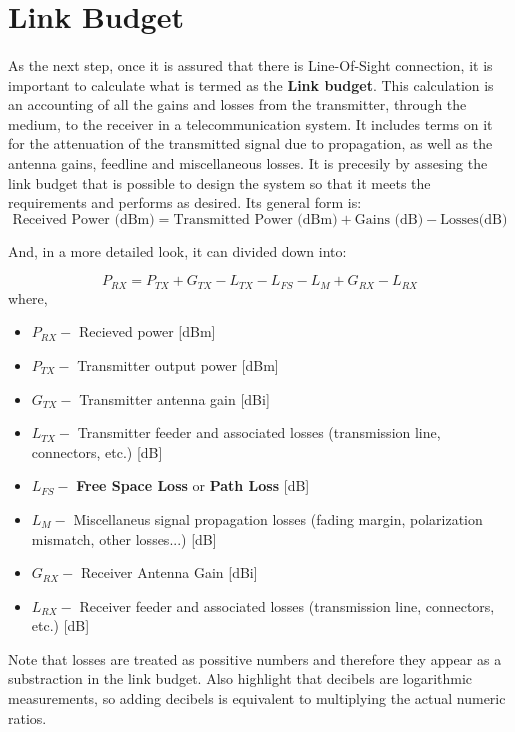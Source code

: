 \section{Link Budget}\label{subsec:link_budget}
\paragraph{}
As the next step, once it is assured that there is Line-Of-Sight connection, it is important to calculate what is termed as the \textbf{Link budget}. This calculation is an accounting of all the gains and losses from the transmitter, through the medium,  to the receiver in a telecommunication system. It includes terms on it for the attenuation of the transmitted signal due to propagation, as well as the antenna gains, feedline and miscellaneous losses. It is precesily by assesing the link budget that is possible to design the system so that it meets the requirements and performs as desired. Its general form is:
\begin{equation*}\label{eq:link_budget} 
 		\text{Received Power (dBm)} = \text{Transmitted Power (dBm)} + \text{Gains (dB)} - \text{Losses(dB)}
\end{equation*}

And, in a more detailed look, it can divided down into:

\begin{equation*}\label{eq:link_budget} 
 		P_{RX} = P_{TX} + G_{TX} - L_{TX} - L_{FS} - L_{M} + G_{RX} - L_{RX}
\end{equation*}
where,
\begin{itemize}
\item{$P_{RX} -$ Recieved power [dBm]}
\item{$P_{TX} -$ Transmitter output power [dBm]}
\item{$G_{TX} -$ Transmitter antenna gain [dBi]}
\item{$L_{TX} -$ Transmitter feeder and associated losses (transmission line, connectors, etc.) [dB]}
\item{$L_{FS} -$ \textbf{Free Space Loss} or \textbf{Path Loss} [dB]}
\item{$L_{M} -$ Miscellaneus signal propagation losses (fading margin, polarization mismatch, other losses...) [dB]} 
\item{$G_{RX} -$ Receiver Antenna Gain [dBi]}
\item{$L_{RX} -$ Receiver feeder and associated losses (transmission line, connectors, etc.) [dB]} 
\end{itemize}
Note that losses are treated as possitive numbers and therefore they appear as a substraction in the link budget. Also highlight that decibels are logarithmic measurements, so adding decibels is equivalent to multiplying the actual numeric ratios.
 
